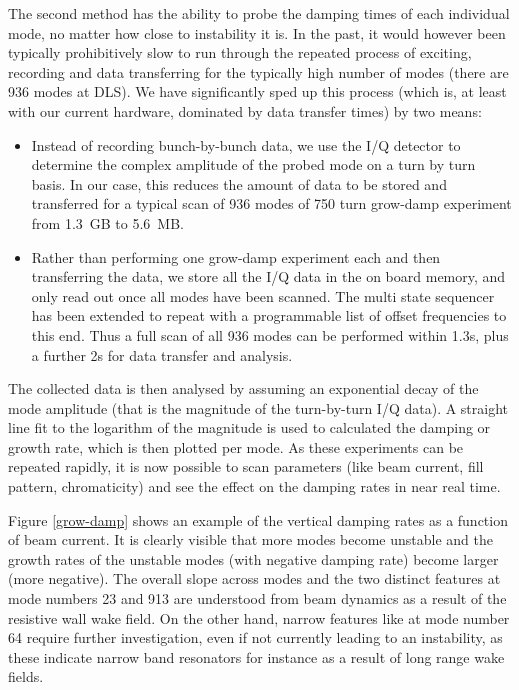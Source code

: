 \documentclass[a4paper]{jacow}
\begin{document}
The second method has the ability to probe the damping times of each individual mode, no matter how close to instability it is. In the past, it would however been typically prohibitively slow to run through the repeated process of exciting, recording and data transferring for the typically high number of modes (there are 936 modes at DLS). We have significantly sped up this process (which is, at least with our current hardware, dominated by data transfer times) by two means:
\begin{itemize}
\item Instead of recording bunch-by-bunch data, we use the I/Q detector to determine the complex amplitude of the probed mode on a turn by turn basis. In our case, this reduces the amount of data to be stored and transferred for a typical scan of 936 modes of 750 turn grow-damp experiment from 1.3~GB to 5.6~MB.
\item Rather than performing one grow-damp experiment each and then transferring the data, we store all the I/Q data in the on board memory, and only read out once all modes have been scanned. The multi state sequencer has been extended to repeat with a programmable list of offset frequencies to this end. Thus a full scan of all 936 modes can be performed within 1.3s, plus a further 2s for data transfer and analysis.
\end{itemize}
The collected data is then analysed by assuming an exponential decay of the mode amplitude (that is the magnitude of the turn-by-turn I/Q data). A straight line fit to the logarithm of the magnitude is used to calculated the damping or growth rate, which is then plotted per mode. As these experiments can be repeated rapidly, it is now possible to scan parameters (like beam current, fill pattern, chromaticity) and see the effect on the damping rates in near real time.

Figure \ref{grow-damp} shows an example of the vertical damping rates as a function of beam current. It is clearly visible that more modes become unstable and the growth rates of the unstable modes (with negative damping rate) become larger (more negative). The overall slope across modes and the two distinct features at mode numbers 23 and 913 are understood from beam dynamics as a result of the resistive wall wake field. On the other hand, narrow features like at mode number 64 require further investigation, even if not currently leading to an instability, as these indicate narrow band resonators for instance as a result of long range wake fields.
\end{document}
